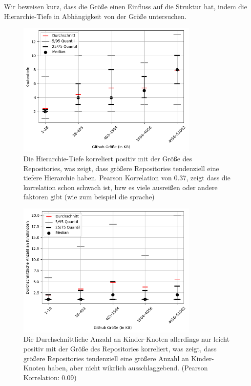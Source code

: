 Wir beweisen kurz, dass die Größe einen Einfluss auf die Struktur hat, indem die Hierarchie-Tiefe in Abhängigkeit von der Größe untersuchen.
\begin{figure}
    \centering
    \includegraphics[width=0.8\textwidth]{images/datenanalyse/githubGrößeVsTiefe.png}
    \caption{Die Hierarchie-Tiefe korreliert positiv mit der Größe des Repositories, was zeigt, dass größere Repositories tendenziell eine tiefere Hierarchie haben. Pearson Korrelation von 0.37, zeigt dass die korrelation schon schwach ist, bzw es viele ausreißen oder andere faktoren gibt (wie zum beispiel die sprache)}
    \label{fig:repoSizeVsTiefe}
\end{figure}

\begin{figure}
    \centering
    \includegraphics[width=0.8\textwidth]{images/datenanalyse/githubGrößeVsBreite.png}
    \caption{Die Durchschnittliche Anzahl an Kinder-Knoten allerdings nur leicht positiv mit der Größe des Repositories korreliert, was zeigt, dass größere Repositories tendenziell eine größere Anzahl an Kinder-Knoten haben, aber nicht wikrlich ausschlaggebend. (Pearson Korrelation: 0.09)}
    \label{fig:repoSizeVsBreite}
\end{figure}


